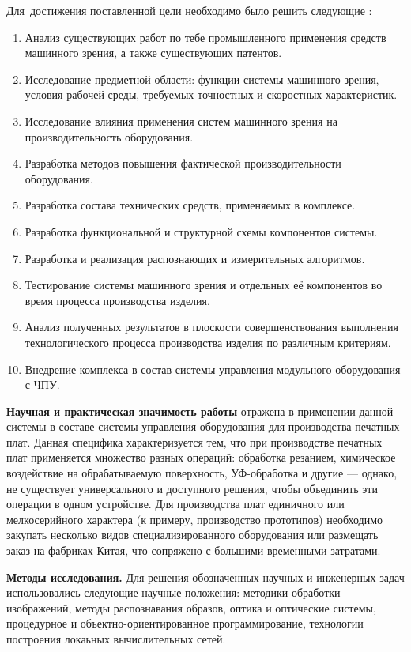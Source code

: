 Для~достижения поставленной цели необходимо было решить следующие {\tasks}:
\begin{enumerate}[beginpenalty=10000] %
 \item Анализ существующих работ по тебе промышленного применения средств машинного зрения, а также существующих патентов.
 \item Исследование предметной области: функции системы машинного зрения, условия рабочей среды, требуемых точностных и скоростных характеристик.
 \item Исследование влияния применения систем машинного зрения на производительность оборудования.
 \item Разработка методов повышения фактической производительности оборудования.
 \item Разработка состава технических средств, применяемых в комплексе.
 \item Разработка функциональной и структурной схемы компонентов системы.
 \item Разработка и реализация распознающих и измерительных алгоритмов.
 \item Тестирование системы машинного зрения и отдельных её компонентов во время процесса производства изделия.
 \item Анализ полученных результатов в плоскости совершенствования выполнения технологического процесса производства изделия по различным критериям.
 \item Внедрение комплекса в состав системы управления модульного оборудования с ЧПУ.
\end{enumerate}

\textbf{Научная и практическая значимость работы} отражена в применении данной системы в составе системы управления оборудования для производства печатных плат. Данная специфика характеризуется тем, что при производстве печатных плат применяется множество разных операций: обработка резанием, химическое воздействие на обрабатываемую поверхность, УФ-обработка и другие — однако, не существует универсального и доступного решения, чтобы объединить эти операции в одном устройстве. Для производства плат единичного или мелкосерийного характера (к примеру, производство прототипов) необходимо закупать несколько видов специализированного оборудования или размещать заказ на фабриках Китая, что сопряжено с большими временными затратами.

\textbf{Методы исследования.} Для решения обозначенных научных и инженерных задач использовались следующие научные положения: методики обработки изображений, методы распознавания образов, оптика и оптические системы, процедурное и объектно-ориентированное программирование, технологии построения локаьных вычислительных сетей.

